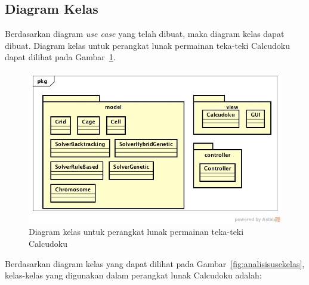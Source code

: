 \subsection{Diagram Kelas}
\label{sec:analisiskelas}

Berdasarkan diagram \textit{use case} yang telah dibuat, maka diagram kelas dapat dibuat. Diagram kelas untuk perangkat lunak permainan teka-teki Calcudoku dapat dilihat pada Gambar~\ref{fig:analisiskelas}.

\begin{figure}
\centering
\captionsetup{justification=centering}
\includegraphics[scale=0.5]{Gambar/Analisis/DiagramKelas.jpg}
\caption[Diagram kelas untuk perangkat lunak permainan teka-teki Calcudoku]{Diagram kelas untuk perangkat lunak permainan teka-teki Calcudoku}
\label{fig:analisiskelas}
\end{figure}

Berdasarkan diagram kelas yang dapat dilihat pada Gambar~\ref{fig:analisisusekelas}, kelas-kelas yang digunakan dalam perangkat lunak Calcudoku adalah:

